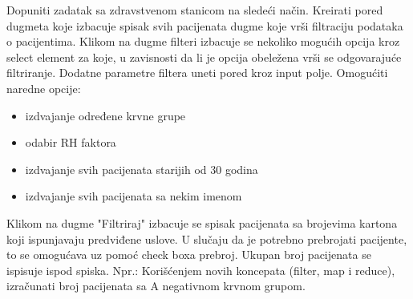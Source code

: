 \begin{primer}
Dopuniti zadatak sa zdravstvenom stanicom na sledeći način. 
Kreirati pored dugmeta koje izbacuje spisak svih pacijenata dugme koje vrši filtraciju podataka o pacijentima.
Klikom na dugme filteri izbacuje se nekoliko mogućih opcija kroz select element za koje, u zavisnosti da li je opcija obeležena vrši se odgovarajuće filtriranje.
Dodatne parametre filtera uneti pored kroz input polje.
Omogućiti naredne opcije:
\begin{itemize}
\item izdvajanje određene krvne grupe
\item odabir RH faktora
\item izdvajanje svih pacijenata starijih od 30 godina
\item izdvajanje svih pacijenata sa nekim imenom 
\end{itemize}
Klikom na dugme "Filtriraj" izbacuje se spisak pacijenata sa brojevima kartona koji ispunjavaju predviđene uslove. 
U slučaju da je potrebno prebrojati pacijente, to se omogućava uz pomoć check boxa prebroj. Ukupan broj pacijenata se ispisuje ispod spiska.
Npr.: Korišćenjem novih koncepata (filter, map i reduce), izračunati broj pacijenata sa A negativnom krvnom grupom.
\end{primer}
\newpage






